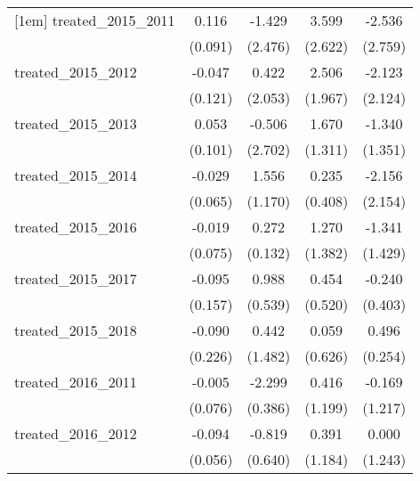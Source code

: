 {\begin{tabular}{l*{4}{c}}
[1em]
treated\_2015\_2011&       0.116         &      -1.429         &       3.599         &      -2.536         \\
            &     (0.091)         &     (2.476)         &     (2.622)         &     (2.759)         \\
[1em]
treated\_2015\_2012&      -0.047         &       0.422         &       2.506         &      -2.123         \\
            &     (0.121)         &     (2.053)         &     (1.967)         &     (2.124)         \\
[1em]
treated\_2015\_2013&       0.053         &      -0.506         &       1.670         &      -1.340         \\
            &     (0.101)         &     (2.702)         &     (1.311)         &     (1.351)         \\
[1em]
treated\_2015\_2014&      -0.029         &       1.556         &       0.235         &      -2.156         \\
            &     (0.065)         &     (1.170)         &     (0.408)         &     (2.154)         \\
[1em]
treated\_2015\_2016&      -0.019         &       0.272\sym{*}  &       1.270         &      -1.341         \\
            &     (0.075)         &     (0.132)         &     (1.382)         &     (1.429)         \\
[1em]
treated\_2015\_2017&      -0.095         &       0.988         &       0.454         &      -0.240         \\
            &     (0.157)         &     (0.539)         &     (0.520)         &     (0.403)         \\
[1em]
treated\_2015\_2018&      -0.090         &       0.442         &       0.059         &       0.496         \\
            &     (0.226)         &     (1.482)         &     (0.626)         &     (0.254)         \\
[1em]
treated\_2016\_2011&      -0.005         &      -2.299\sym{***}&       0.416         &      -0.169         \\
            &     (0.076)         &     (0.386)         &     (1.199)         &     (1.217)         \\
[1em]
treated\_2016\_2012&      -0.094         &      -0.819         &       0.391         &       0.000         \\
            &     (0.056)         &     (0.640)         &     (1.184)         &     (1.243)         \\

\end{tabular}}
